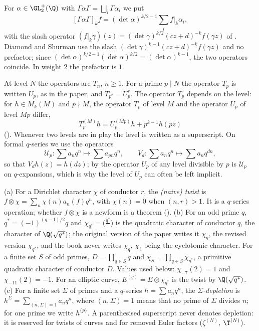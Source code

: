 \begin{convention}\label{conv:hecke:double-coset}
For $\alpha\in\GL_2^+(\Q)$ with $\Gamma\alpha\Gamma=\bigsqcup_i\Gamma\alpha_i$ we put
\[
[\Gamma\alpha\Gamma]_kf=(\det\alpha)^{k/2-1}\sum_if|_k\alpha_i,
\]
with the slash operator $(f|_k\gamma)(z)=(\det\gamma)^{k/2}(cz+d)^{-k}f(\gamma z)$ of . Diamond and Shurman \cite[Section 5.1]{DiamondShurman} use the slash
$(\det\gamma)^{k-1}(cz+d)^{-k}f(\gamma z)$ and no prefactor; since $(\det\alpha)^{k/2-1}(\det\alpha)^{k/2}=(\det\alpha)^{k-1}$, the two operators coincide. In weight $2$ the prefactor
is $1$.
\end{convention}

\begin{convention}\label{conv:hecke:level}
At level $N$ the operators are $T_n$, $n\ge1$. For a prime $p\mid N$ the operator $T_p$ is written $U_p$, as in the paper, and $T_{p^r}=U_p^r$. The operator $T_p$
depends on the level: for $h\in M_k(M)$ and $p\nmid M$, the operator $T_p$ of level $M$ and the operator $U_p$ of level $Mp$ differ,
\[
T_p^{(M)}h=U_p^{(Mp)}h+p^{k-1}h(pz)
\]
(). Whenever two levels are in play the level is written as a superscript. On formal $q$-series we use the operators
\[
\mathcal U_p\colon\sum a_nq^n\mapsto\sum a_{pn}q^n,\qquad V_d\colon\sum a_nq^n\mapsto\sum a_nq^{dn},
\]
so that $V_dh(z)=h(dz)$; by  the operator $U_p$ of any level divisible by $p$ is $\mathcal U_p$ on $q$-expansions, which is why the
level of $U_p$ can often be left implicit.
\end{convention}

\begin{convention}\label{conv:hecke:twists}
(a) For a Dirichlet character $\chi$ of conductor $r$, the \emph{(naive) twist} is $f\otimes\chi=\sum_n\chi(n)a_n(f)q^n$, with $\chi(n)=0$ when $(n,r)>1$. It is a $q$-series operation;
whether $f\otimes\chi$ is a newform is a theorem (). (b) For an odd prime $q$, $q^*=(-1)^{(q-1)/2}q$ and $\chi_{q^*}=\bigl(\frac{q^*}{\cdot}\bigr)$ is the quadratic
character of conductor $q$, the character of $\Q(\sqrt{q^*})$; the original version of the paper writes it $\chi_q$, the revised version $\chi_{q^*}$, and the book never writes $\chi_q$, $\chi_\ell$ being the cyclotomic character. For a finite
set $S$ of odd primes, $D=\prod_{q\in S}q$ and $\chi_S=\prod_{q\in S}\chi_{q^*}$, a primitive quadratic character of conductor $D$. Values used below: $\chi_{-7}(2)=1$ and
$\chi_{-11}(2)=-1$. For an elliptic curve, $E^{(q)}=E\otimes\chi_{q^*}$ is the twist by $\Q(\sqrt{q^*})$. (c) For a finite set $\Sigma$ of primes and a $q$-series $h=\sum a_nq^n$,
the \emph{$\Sigma$-depletion} is $h^\Sigma=\sum_{(n,\Sigma)=1}a_nq^n$, where $(n,\Sigma)=1$ means that no prime of $\Sigma$ divides $n$; for one prime we write $h^{\{p\}}$. A parenthesised
superscript never denotes depletion: it is reserved for twists of curves and for removed Euler factors ($\zeta^{(N)}$, $\T^{(N)}$).
\end{convention}

